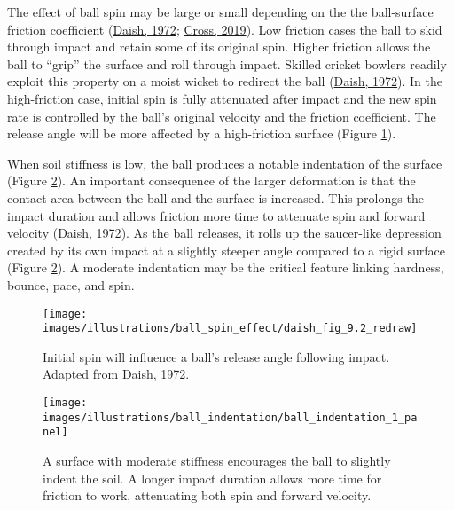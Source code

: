 \documentclass[
  letterpaper,
  openany]{book}
\begin{document}
The effect of ball spin may be large or small depending on the the ball-surface friction coefficient (\protect\hyperlink{ref-Daish1972}{Daish, 1972}; \protect\hyperlink{ref-Cross2019}{Cross, 2019}).
Low friction cases the ball to skid through impact and retain some of its original spin.
Higher friction allows the ball to ``grip'' the surface and roll through impact.
Skilled cricket bowlers readily exploit this property on a moist wicket to redirect the ball (\protect\hyperlink{ref-Daish1972}{Daish, 1972}).
In the high-friction case, initial spin is fully attenuated after impact and the new spin rate is controlled by the ball's original velocity and the friction coefficient.
The release angle will be more affected by a high-friction surface (Figure \ref{fig:daish-spin-release-angle}).

When soil stiffness is low, the ball produces a notable indentation of the surface (Figure \ref{fig:ball-indentation-release-angle}).
An important consequence of the larger deformation is that the contact area between the ball and the surface is increased.
This prolongs the impact duration and allows friction more time to attenuate spin and forward velocity (\protect\hyperlink{ref-Daish1972}{Daish, 1972}).
As the ball releases, it rolls up the saucer-like depression created by its own impact at a slightly steeper angle compared to a rigid surface (Figure \ref{fig:ball-indentation-release-angle}).
A moderate indentation may be the critical feature linking hardness, bounce, pace, and spin.

\begin{figure}

{\centering \texttt{[image: images/illustrations/ball\_spin\_effect/daish\_fig\_9.2\_redraw]} 

}

\caption[Ball spin effect on release angle]{Initial spin will influence a ball's release angle following impact. Adapted from Daish, 1972.}\label{fig:daish-spin-release-angle}
\end{figure}

\begin{figure}

{\centering \texttt{[image: images/illustrations/ball\_indentation/ball\_indentation\_1\_panel]} 

}

\caption[Deformation of infield soil surface at ball impact]{A surface with moderate stiffness encourages the ball to slightly indent the soil. A longer impact duration allows more time for friction to work, attenuating both spin and forward velocity.}\label{fig:ball-indentation-release-angle}
\end{figure}
\end{document}
